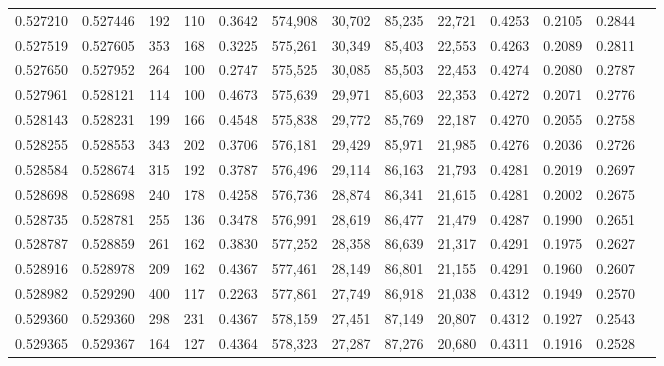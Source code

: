 \begin{tabular}{rrrrrrrrrrrrr}
0.527210 & 0.527446 &   192 &   110 &                                     0.3642 & 574,908 &  30,702 &  85,235 &  22,721 & 0.4253 & 0.2105 & 0.2844 \\
0.527519 & 0.527605 &   353 &   168 &                                     0.3225 & 575,261 &  30,349 &  85,403 &  22,553 & 0.4263 & 0.2089 & 0.2811 \\
0.527650 & 0.527952 &   264 &   100 &                                     0.2747 & 575,525 &  30,085 &  85,503 &  22,453 & 0.4274 & 0.2080 & 0.2787 \\
0.527961 & 0.528121 &   114 &   100 &                                     0.4673 & 575,639 &  29,971 &  85,603 &  22,353 & 0.4272 & 0.2071 & 0.2776 \\
0.528143 & 0.528231 &   199 &   166 &                                     0.4548 & 575,838 &  29,772 &  85,769 &  22,187 & 0.4270 & 0.2055 & 0.2758 \\
0.528255 & 0.528553 &   343 &   202 &                                     0.3706 & 576,181 &  29,429 &  85,971 &  21,985 & 0.4276 & 0.2036 & 0.2726 \\
0.528584 & 0.528674 &   315 &   192 &                                     0.3787 & 576,496 &  29,114 &  86,163 &  21,793 & 0.4281 & 0.2019 & 0.2697 \\
0.528698 & 0.528698 &   240 &   178 &                                     0.4258 & 576,736 &  28,874 &  86,341 &  21,615 & 0.4281 & 0.2002 & 0.2675 \\
0.528735 & 0.528781 &   255 &   136 &                                     0.3478 & 576,991 &  28,619 &  86,477 &  21,479 & 0.4287 & 0.1990 & 0.2651 \\
0.528787 & 0.528859 &   261 &   162 &                                     0.3830 & 577,252 &  28,358 &  86,639 &  21,317 & 0.4291 & 0.1975 & 0.2627 \\
0.528916 & 0.528978 &   209 &   162 &                                     0.4367 & 577,461 &  28,149 &  86,801 &  21,155 & 0.4291 & 0.1960 & 0.2607 \\
0.528982 & 0.529290 &   400 &   117 &                                     0.2263 & 577,861 &  27,749 &  86,918 &  21,038 & 0.4312 & 0.1949 & 0.2570 \\
0.529360 & 0.529360 &   298 &   231 &                                     0.4367 & 578,159 &  27,451 &  87,149 &  20,807 & 0.4312 & 0.1927 & 0.2543 \\
0.529365 & 0.529367 &   164 &   127 &                                     0.4364 & 578,323 &  27,287 &  87,276 &  20,680 & 0.4311 & 0.1916 & 0.2528 \\

\end{tabular}
